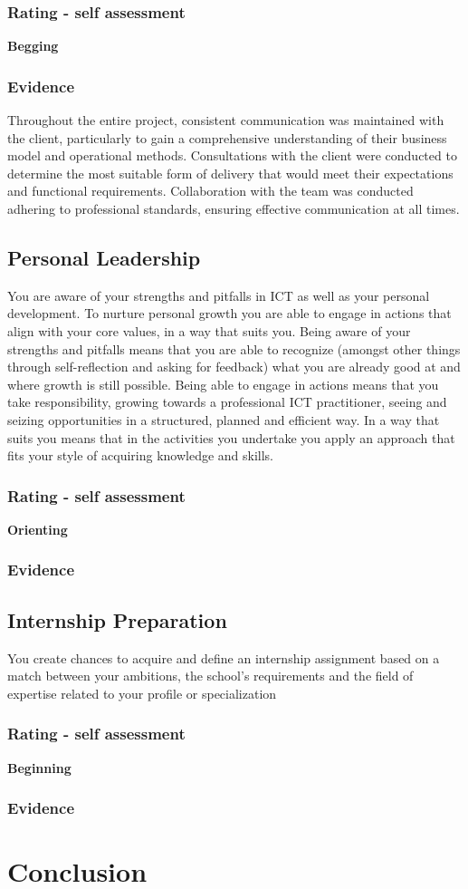 \documentclass[a4paper, 11pt]{article}
\begin{document}
\subsubsection{Rating - self assessment}
\textbf{Begging} 
\subsubsection{Evidence} 
Throughout the entire project, consistent communication was maintained with the client, particularly to gain a comprehensive understanding of their business model and operational methods. Consultations with the client were conducted to determine the most suitable form of delivery that would meet their expectations and functional requirements. Collaboration with the team was conducted adhering to professional standards, ensuring effective communication at all times.




\subsection{Personal Leadership}
You are aware of your strengths and pitfalls in ICT as well as your personal development. To nurture personal growth you are able to engage in actions that align with your core values, in a way that suits you.
\medbreak
Being aware of your strengths and pitfalls means that you are able to recognize (amongst other things through self-reflection and asking for feedback) what you are already good at and where growth is still possible.   Being able to engage in actions means that you take responsibility, growing towards a professional ICT practitioner, seeing and seizing opportunities in a structured, planned and efficient way. In a way that suits you means that in the activities you undertake you apply an approach that fits your style of acquiring knowledge and skills. 

\pagebreak



\subsubsection{Rating - self assessment}
\textbf{Orienting} 
\subsubsection{Evidence}

\subsection{Internship Preparation}
You create chances to acquire and define an internship assignment based on a match between your ambitions, the school's requirements and the field of expertise related to your profile or specialization

\subsubsection{Rating - self assessment}
\textbf{Beginning} 
\subsubsection{Evidence}



\section{Conclusion}
\end{document}
